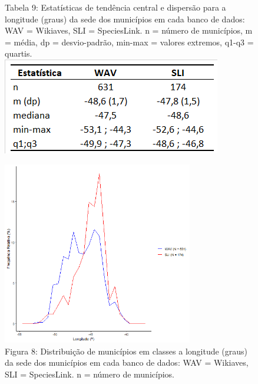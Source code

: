 \begin{figure}[h!]
\centering
{\scriptsize Tabela 9: Estatísticas de tendência central e dispersão para a longitude (graus) da sede dos municípios em cada banco de dados: WAV = Wikiaves, SLI = SpeciesLink. n = número de municípios, m = média, dp = desvio-padrão, min-max = valores extremos, q1-q3 = quartis.}
\\
\includegraphics{Tabelas/9.png}
\end{figure}

\texto


\begin{figure}[h!]
\centering
\includegraphics[height = 8cm]{Imagens/253.png}
\\{\scriptsize Figura 8: Distribuição de municípios em classes a longitude (graus) da sede dos municípios em cada banco de dados: WAV = Wikiaves, SLI = SpeciesLink. n = número de municípios.}
\end{figure}

\newpage
